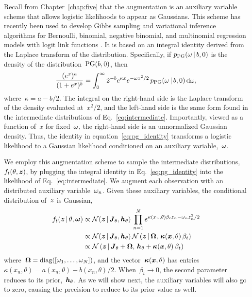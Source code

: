 Recall from Chapter~\ref{chap:five} that the \polyagamma augmentation
is an auxiliary variable scheme that allows logistic likelihoods to
appear as Gaussians.  This scheme has recently been used to develop
Gibbs sampling and variational inference algorithms for Bernoulli,
binomial, negative binomial, and multinomial regression models with
logit link functions \citep{polson2013bayesian}.  It is based on an
integral identity derived from the Laplace transform of the
\polyagamma distribution.  Specifically, if
$p_{\mathrm{PG}}({\omega}\,|\, b, 0)$ is the density of the
\polyagamma distribution~${\mathrm{PG}(b, 0)}$, then
\begin{equation}
\frac{(e^{x})^a}{(1+e^{x})^b} = \int_{0}^{\infty} 2^{-b} e^{\kappa x}  e^{-{\omega} x^2 /2} \, p_{\mathrm{PG}}({\omega} \,|\, b, 0) \, \mathrm{d}{\omega},
\label{eq:pg_identity}
\end{equation}
where~${\kappa=a-b/2}$. The integral on the right-hand side is the
Laplace transform of the \polyagamma density evaluated at~$x^2/2$, and
the left-hand side is the same form found in the intermediate
distributions of Eq.~\ref{eq:intermediate}.  Importantly, viewed as a
function of~$x$ for fixed~${\omega}$, the right-hand side is an
unnormalized Gaussian density.  Thus, the identity in
equation~\ref{eq:pg_identity} transforms a logistic likelihood to a
Gaussian likelihood conditioned on an auxiliary variable,~${\omega}$.

We employ this augmentation scheme to sample the intermediate
distributions,~$f_t(\theta, \boldsymbol{z})$, by plugging the
integral identity in Eq.~\ref{eq:pg_identity} into the likelihood
of Eq.~\ref{eq:intermediate}. We augment each observation
with an \polyagamma distributed auxiliary variable~${\omega}_n$.
Given these auxiliary variables, the conditional distribution of~$\boldsymbol{z}$ is Gaussian,
\begin{align}
  \label{eq:f_t}
  f_t(\boldsymbol{z} \,|\, \theta, {\boldsymbol{{\omega}}}) &\propto \mathcal{N}(\boldsymbol{z} \,|\, \boldsymbol{J}_\theta, \boldsymbol{h}_\theta) \,
  \prod_{n=1}^N e^{\kappa(x_n, \theta) \beta_t z_n - {\omega}_n z_n^2 /2} \\
  &\propto \mathcal{N}(\boldsymbol{z} \,|\, \boldsymbol{J}_\theta, \boldsymbol{h}_\theta) \,
  \mathcal{N} \left(\boldsymbol{z} \,|\, {\boldsymbol{{\Omega}}}, \, \boldsymbol{\kappa}(\boldsymbol{x}, \theta) \,\beta_t \right) \\
  &\propto \mathcal{N} \left(\boldsymbol{z} \,|\, \boldsymbol{J}_\theta + {\boldsymbol{{\Omega}}},\,
  \boldsymbol{h}_\theta + \boldsymbol{\kappa}(\boldsymbol{x}, \theta) \,\beta_t \right)
\end{align}
where~${{\boldsymbol{{\Omega}}} = \text{diag}([{\omega}_1, \ldots, {\omega}_N])}$, and
the vector~${\boldsymbol{\kappa}(\boldsymbol{x}, \theta)}$ has entries~
${\kappa(x_n, \theta) = a(x_n, \theta) - b(x_n, \theta)/2}$.
When~${\beta_t \to 0}$, the second parameter reduces to its prior,~$\boldsymbol{h}_\theta$.
As we will show next, the auxiliary variables will also go
to zero, causing the precision to reduce to its prior value as well.

